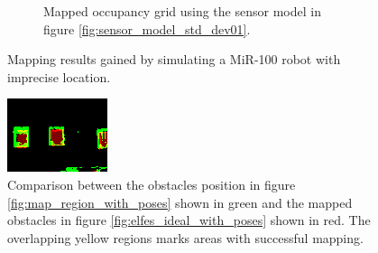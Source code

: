 \begin{figure}[htbp]
\begin{subfigure}[t]{0.45\textwidth}
		\caption{Mapped occupancy grid using the sensor model in figure \vref{fig:sensor_model_std_dev01}.}
		\label{fig:elfes_ideal_with_poses}
	\end{subfigure}
	\caption{Mapping results gained by simulating a MiR-100 robot with imprecise location.}
	\label{fig:simulated_location_error}
\end{figure}

\begin{figure}[htbp]
	\centering
	\includegraphics[width=0.5\linewidth]{figures/static_mapping/elfes_ideal_no_decay}
	\caption{Comparison between the obstacles position in figure  \vref{fig:map_region_with_poses} shown in green and the mapped obstacles in figure \vref{fig:elfes_ideal_with_poses} shown in red. The overlapping yellow regions marks areas with successful mapping.}
	\label{fig:elfes_compare}
\end{figure}

